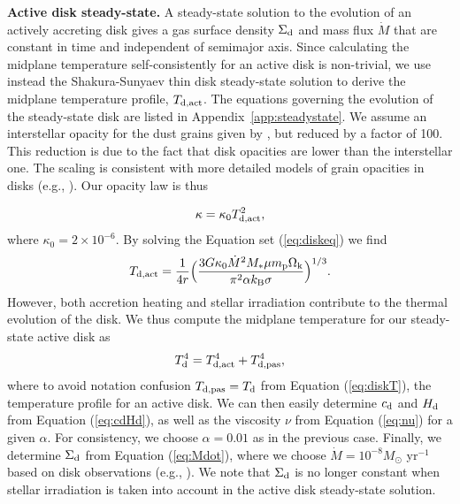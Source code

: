 \documentclass[apj]{emulateapj}
\newcommand{\App}[1]{Appendix~\ref{#1}}
\begin{document}
\textbf{Active disk steady-state.} A steady-state solution to the evolution of an actively accreting disk gives a gas surface density $\Sigma_{\rm d}$ and mass flux $\dot{M}$ that are constant in time and independent of semimajor axis. Since calculating the midplane temperature self-consistently for an active disk is non-trivial, we use instead the Shakura-Sunyaev thin disk steady-state solution to derive the midplane temperature profile, $T_{\rm d, act}$. The equations governing the evolution of the steady-state disk are listed in \App{app:steadystate}. We assume an interstellar opacity for the dust grains given by \citet{bell94}, but reduced by a factor of 100. This reduction is due to the fact that disk opacities are lower than the interstellar one. The scaling is consistent with more detailed models of grain opacities in disks (e.g., \citealt{mordasini14}). Our opacity law is thus

\begin{equation}
\label{eq:opacity}
\kappa=\kappa_0 T_{\rm d, act}^2,
\end{equation}
where $\kappa_0=2 \times 10^{-6}$. By solving the Equation set (\ref{eq:diskeq}) we find
\begin{equation}
\label{eq:Tdact}
T_{\rm d, act}=\frac{1}{4 r} \Big(\frac{3 G \kappa_0\dot{M}^2 M_* \mu m_{\rm p} \Omega_{\rm k}}{\pi^2 \alpha k_{\rm B} \sigma}\Big)^{1/3}.
\end{equation}
However, both accretion heating and stellar irradiation contribute to the thermal evolution of the disk. We thus compute the midplane temperature for our steady-state active disk as
\begin{equation}
\label{eq:activeT}
T_{\rm d}^4 = T_{\rm d, act}^4 + T_{\rm d, pas}^4,
\end{equation}
where to avoid notation confusion $T_{\rm d, pas}=T_{\rm d}$ from Equation (\ref{eq:diskT}), the temperature profile for an active disk. We can then easily determine  $c_{\rm d}$ and $H_{\rm d}$ from Equation (\ref{eq:cdHd}), as well as the viscosity $\nu$ from Equation (\ref{eq:nu}) for a given $\alpha$. For consistency, we choose  $\alpha=0.01$ as in the previous case. Finally, we determine $\Sigma_{\rm d}$ from Equation (\ref{eq:Mdot}), where we choose $\dot{M}=10^{-8} M_{\odot}$ yr$^{-1}$ based on disk observations (e.g., \citealt{andrews10}). We note that $\Sigma_{\rm d}$ is no longer constant when stellar irradiation is taken into account in the active disk steady-state solution. 

\end{document}

